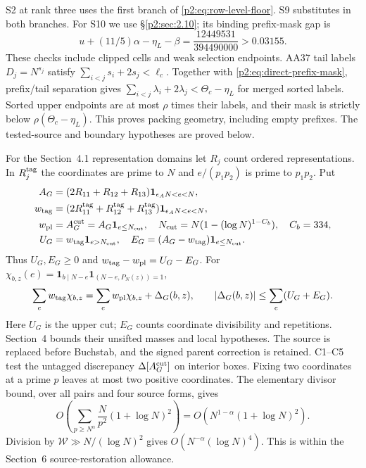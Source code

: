 S2 at rank three uses the first branch of \eqref{p2:eq:row-level-floor}.
S9 substitutes in both branches.
For S10 we use \S\ref{p2:sec:2.10}; its binding prefix-mask gap is
\[
 u+(11/5)\alpha-\eta_L-\beta
 =\frac{12449531}{394490000}>0.03155.
\]
These checks include clipped cells and weak selection endpoints.
AA37 tail labels $D_j=N^{s_j}$ satisfy $\sum_{i<j}s_i+2s_j<\ell_c$.
Together with \eqref{p2:eq:direct-prefix-mask}, prefix/tail separation gives
$\sum_{i<j}\lambda_i+2\lambda_j<\Theta_c-\eta_L$ for merged sorted labels.
Sorted upper endpoints are at most $\rho$ times their labels,
and their mask is strictly below $\rho(\Theta_c-\eta_L)$.
This proves packing geometry, including empty prefixes.
The tested-source and boundary hypotheses are proved below.

For the Section~4.1 representation domains let $R_j$ count ordered representations.
In $R_j^{\rm tag}$ the coordinates are prime to $N$
and $e/(p_1p_2)$ is prime to $p_1p_2$. Put
\[
\begin{aligned}
 A_G&=(2R_{11}+R_{12}+R_{13})\mathbf1_{\epsilon_AN<e<N},\\
 w_{\rm tag}&=(2R_{11}^{\rm tag}+R_{12}^{\rm tag}+R_{13}^{\rm tag})
                    \mathbf1_{\epsilon_AN<e<N},\\
 w_{\rm pl}&=A_G^{\rm cut}=A_G\mathbf1_{e\le N_{\rm cut}},\quad
 N_{\rm cut}=N(1-(\log N)^{1-C_b}),\quad C_b=334,\\
 U_G&=w_{\rm tag}\mathbf1_{e>N_{\rm cut}},\quad
 E_G=(A_G-w_{\rm tag})\mathbf1_{e\le N_{\rm cut}}.
\end{aligned}
\]
Thus $U_G,E_G\ge0$ and $w_{\rm tag}-w_{\rm pl}=U_G-E_G$.
For $\chi_{b,z}(e)=\mathbf1_{b\mid N-e}\mathbf1_{(N-e,P_N(z))=1}$,
\[
 \sum_e w_{\rm tag}\chi_{b,z}=\sum_e w_{\rm pl}\chi_{b,z}+\Delta_G(b,z),
 \qquad |\Delta_G(b,z)|\le\sum_e(U_G+E_G).
\]
Here $U_G$ is the upper cut; $E_G$ counts coordinate divisibility and repetitions.
Section~4 bounds their unsifted masses and local hypotheses.
The source is replaced before Buchstab, and the signed parent correction is retained.
C1--C5 test the untagged discrepancy $\Delta[A_G^{\rm cut}]$ on interior boxes.
Fixing two coordinates at a prime $p$ leaves at most two positive coordinates.
The elementary divisor bound, over all pairs and four source forms, gives
\[
 O\!\left(\sum_{p\ge N^\alpha}\frac N{p^2}(1+\log N)^2\right)
 =O(N^{1-\alpha}(1+\log N)^2).
\]
Division by $\mathcal W\gg N/(\log N)^2$ gives $O(N^{-\alpha}(\log N)^4)$.
This is within the Section~6 source-restoration allowance.

